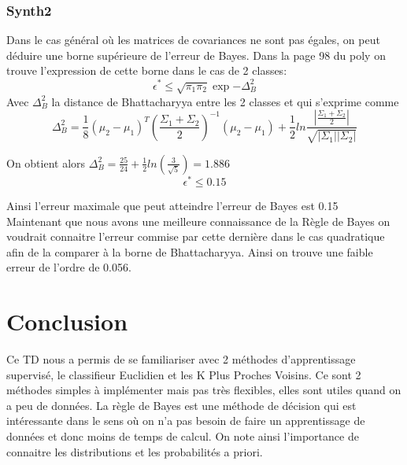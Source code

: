 \documentclass[10pt]{article}
\begin{document}
\subsubsection{Synth2}
Dans le cas général où les matrices de covariances ne sont pas égales, on peut déduire une borne supérieure de l'erreur de Bayes. Dans la page 98 du poly on trouve l'expression de cette borne dans le cas de 2 classes:
\[ \epsilon^{*} \leq \sqrt{\pi_{1}\pi_{2}}  \exp{-\Delta_{B}^{2}} \]
Avec $\Delta_{B}^{2}$ la distance de Bhattacharyya entre les 2 classes et qui s'exprime comme 
\[  \Delta_{B}^{2} = \frac{1}{8} (\mu_{2} - \mu_{1})^{T}  (\frac{\Sigma_{1} + \Sigma_{2}}{2})^{-1} (\mu_{2} - \mu_{1}) + 
\frac{1}{2} ln\frac{|\frac{\Sigma_{1}+\Sigma_{2}}{2}|}{\sqrt{|\Sigma_{1}| |\Sigma_{2}|}} \]

On obtient alors $\Delta_{B}^{2} = \frac{25}{24} +\frac{1}{2} ln(\frac{3}{\sqrt{5}} ) = 1.886$
\[  \epsilon^{*} \leq 0.15\]

Ainsi l'erreur maximale que peut atteindre l'erreur de Bayes est 0.15\\
Maintenant que nous avons une meilleure connaissance de la Règle de Bayes on voudrait connaitre l'erreur commise par cette dernière dans le cas quadratique afin de la comparer à la borne de Bhattacharyya. Ainsi on trouve une faible erreur de l'ordre de 0.056.

\section{Conclusion}
Ce TD nous a permis de se familiariser avec 2 méthodes d'apprentissage supervisé, le classifieur Euclidien et les K Plus Proches Voisins. Ce sont 2 méthodes simples à implémenter mais pas très flexibles, elles sont utiles quand on a peu de données. La règle de Bayes est une méthode de décision qui est intéressante dans le sens où on n'a pas besoin de faire un apprentissage de données et donc moins de temps de calcul. On note ainsi l'importance de connaitre les distributions et les probabilités a priori.
	
\end{document}
